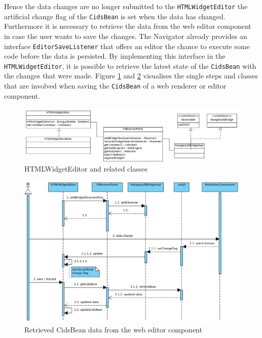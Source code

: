 Hence the data changes are no longer submitted to the \texttt{HTMLWidgetEditor} the artificial change flag of the \texttt{CidsBean} is set when the data has changed. 
Furthermore it is necessary to retrieve the data from the web editor component in case the user wants to save the changes. 
The Navigator already provides an interface \texttt{EditorSaveListener} that offers an editor the chance to execute some code before the data is persisted. 
By implementing this interface in the \texttt{HTMLWidgetEditor}, it is possible to retrieve the latest state of the \texttt{CidsBean} with the changes that were made.
Figure \ref{fig:class_diag_html_widget_editor} and \ref{fig:seq-diag-data-exchange-2} visualises the single steps and classes that are involved when saving the \texttt{CidsBean} of a web renderer or editor component.
 
\begin{figure}
	\centering	\includegraphics[width=1.0\textwidth]{./img/classDiagramms/html_editor.png}
	\caption{HTMLWidgetEditor and related classes}
	\label{fig:class_diag_html_widget_editor}
\end{figure}

\begin{figure}
	\centering	\includegraphics[width=1.0\textwidth]{./img/classDiagramms/seq_diag_data_exchange_2.png}
	\caption{Retrieved CidsBean data from the web editor component}
	\label{fig:seq-diag-data-exchange-2}
\end{figure}

